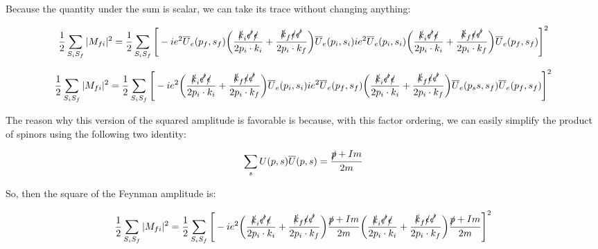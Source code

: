 \documentclass[a4]{article}
\begin{document}
    Because the quantity under the sum is scalar, we can take its trace without changing anything:

    \begin{equation}
        \frac{1}{2} \sum_{S_i S_f} |M_{fi}|^2 = \frac{1}{2} \sum_{S_i S_f} \Bigg[- i e^2 \overline{U}_e (p_f, s_f) \bigg(\frac{\slashed{k}_i \slashed{\epsilon'} \slashed{\epsilon}}{2 p_i \cdot k_i} + \frac{\slashed{k}_f \slashed{\epsilon} \slashed{\epsilon'}}{2 p_i \cdot k_f} \bigg) \overline{U}_e (p_i, s_i) i e^2 \overline{U}_e (p_i, s_i) \bigg(\frac{\slashed{k}_i \slashed{\epsilon'} \slashed{\epsilon}}{2 p_i \cdot k_i} + \frac{\slashed{k}_f \slashed{\epsilon} \slashed{\epsilon'}}{2 p_i \cdot k_f} \bigg) \overline{U}_e (p_f, s_f) \Bigg]^2
    \end{equation}

    \begin{equation}
        \frac{1}{2} \sum_{S_i S_f} |M_{fi}|^2 = \frac{1}{2} \sum_{S_i S_f} \Bigg[- i e^2 \bigg(\frac{\slashed{k}_i \slashed{\epsilon'} \slashed{\epsilon}}{2 p_i \cdot k_i} + \frac{\slashed{k}_f \slashed{\epsilon} \slashed{\epsilon'}}{2 p_i \cdot k_f} \bigg) \overline{U}_e (p_i, s_i) i e^2 \overline{U}_e (p_f, s_f) \bigg(\frac{\slashed{k}_i \slashed{\epsilon'} \slashed{\epsilon}}{2 p_i \cdot k_i} + \frac{\slashed{k}_f \slashed{\epsilon} \slashed{\epsilon'}}{2 p_i \cdot k_f} \bigg) \overline{U}_e (p_ss, s_f) \overline{U}_e (p_f, s_f) \Bigg]^2
    \end{equation}

    The reason why this version of the squared amplitude is favorable is because, with this factor ordering, we can easily simplify the product of spinors using the following two identity:

    \begin{equation}
        \sum_{s} U (p, s) \overline{U} (p, s) = \frac{\slashed{p} + I m}{2 m}
    \end{equation}

    So, then the square of the Feynman amplitude is:

    \begin{equation}
        \frac{1}{2} \sum_{S_i S_f} |M_{fi}|^2 = \frac{1}{2} \sum_{S_i S_f} \Bigg[- i e^2 \bigg(\frac{\slashed{k}_i \slashed{\epsilon'} \slashed{\epsilon}}{2 p_i \cdot k_i} + \frac{\slashed{k}_f \slashed{\epsilon} \slashed{\epsilon'}}{2 p_i \cdot k_f} \bigg) \frac{\slashed{p} + I m}{2 m} \bigg(\frac{\slashed{k}_i \slashed{\epsilon'} \slashed{\epsilon}}{2 p_i \cdot k_i} + \frac{\slashed{k}_f \slashed{\epsilon} \slashed{\epsilon'}}{2 p_i \cdot k_f} \bigg) \frac{\slashed{p} + I m}{2 m} \Bigg]^2
    \end{equation}
\end{document}
